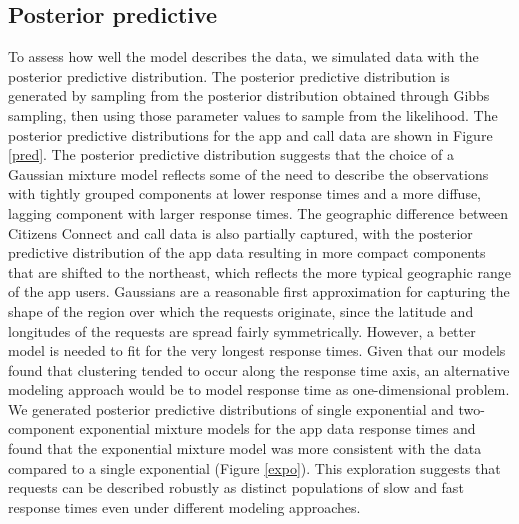 \documentclass[twoside]{article}
\theoremstyle{theorem}
\theoremstyle{theorem}
\theoremstyle{theorem}
\theoremstyle{lemma}
\theoremstyle{definition}
\theoremstyle{example}
\begin{document}
\subsection{Posterior predictive}
To assess how well the model describes the data, we simulated data with the posterior predictive distribution. The posterior predictive distribution is generated by sampling from the posterior distribution obtained through Gibbs sampling, then using those parameter values to sample from the likelihood. The posterior predictive distributions for the app and call data are shown in Figure \ref{pred}. The posterior predictive distribution suggests that the choice of a Gaussian mixture model reflects some of the need to describe the observations with tightly grouped components at lower response times and a more diffuse, lagging component with larger response times. The geographic difference between Citizens Connect and call data is also partially captured, with the posterior predictive distribution of the app data resulting in more compact components that are shifted to the northeast, which reflects the more typical geographic range of the app users. Gaussians are a reasonable first approximation for capturing the shape of the region over which the requests originate, since the latitude and longitudes of the requests are spread fairly symmetrically. However, a better model is needed to fit for the very longest response times. Given that our models found that clustering tended to occur along the response time axis, an alternative modeling approach would be to model response time as one-dimensional problem. We generated posterior predictive distributions of single exponential and two-component exponential mixture models for the app data response times and found that the exponential mixture model was more consistent with the data compared to a single exponential (Figure \ref{expo}). This exploration suggests that requests can be described robustly as distinct populations of slow and fast response times even under different modeling approaches. 
\end{document}
